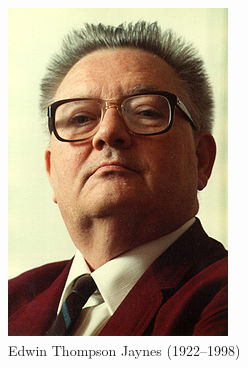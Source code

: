 \documentclass[12pt,hyperref={CJKbookmarks=true}]{beamer}
\begin{document}
\begin{frame}
\begin{minipage}[t]{0.65\linewidth}
    \end{minipage}
    \begin{minipage}[t]{0.3\linewidth}
    \begin{figure}[!ht]
     \centering
     \includegraphics[width=0.8\linewidth]{ETJaynes.jpg}
     \caption{Edwin Thompson Jaynes (1922--1998)}
    \end{figure}
    \end{minipage}
\end{frame}
\end{document}

